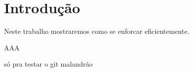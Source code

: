 \chapter{Introdução}\label{chap:intro}
Neste trabalho mostraremos como se enforcar eficientemente.

AAA

só pra testar o git malandrão
